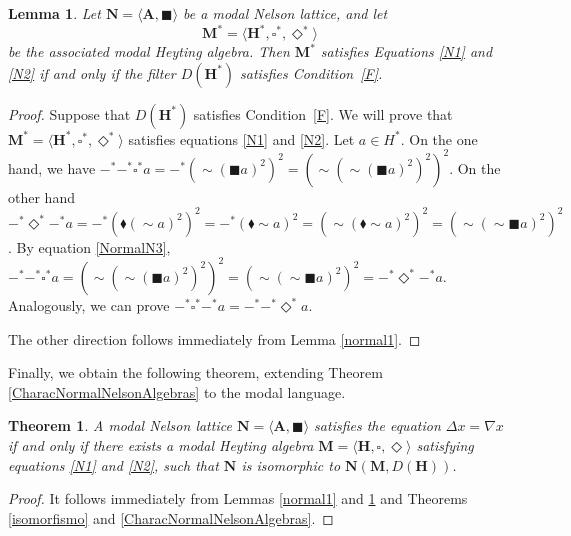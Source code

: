 \documentclass[pdflatex,sn-mathphys-num]{sn-jnl}%
\newtheorem{lemma}{Lemma}
\newcommand{\A}{\mathbf{A}}
\newcommand{\He}{\mathbf{H}}
\theoremstyle{thmstyleone}%
\newtheorem{theorem}{Theorem}%
\theoremstyle{thmstyletwo}%
\theoremstyle{thmstylethree}%
\begin{document}
\begin{lemma}\label{normal2}
Let $\mathbf{N}=\langle \A,\blacksquare\rangle$ be a modal Nelson lattice, and let
\[
\mathbf{M}^*=\langle \mathbf{H}^*,\square^*,\Diamond^*\rangle
\]
be the associated modal Heyting algebra. Then $\mathbf{M}^*$ satisfies Equations \eqref{N1} and \eqref{N2} if and only if the filter $D(\He^*)$ satisfies Condition~\eqref{F}.
\end{lemma}

\begin{proof}
Suppose that $D(\He^*)$ satisfies Condition~\eqref{F}. We will prove that $\mathbf{M}^*=\langle \He^*,\square^*,\Diamond^*\rangle$ satisfies equations \eqref{N1} and \eqref{N2}. Let $a\in H^*$. On the one hand, we have $-^*-^* \square^* a=-^*(\sim (\blacksquare a)^2 )^2=(\sim (\sim (\blacksquare a)^2 )^2)^2$. On the other hand $-^*\Diamond^*-^* a=-^*(\blacklozenge (\sim a)^2)^2=-^*(\blacklozenge \sim a)^2=(\sim (\blacklozenge \sim a)^2)^2=(\sim (\sim \blacksquare a)^2)^2$. By equation \eqref{NormalN3}, $-^*-^* \square^* a=(\sim (\sim (\blacksquare a)^2 )^2)^2=(\sim (\sim \blacksquare a)^2)^2=-^*\Diamond^*-^* a$. Analogously, we can prove $-^* \square^*-^* a=-^*-^*\Diamond^* a$.

The other direction follows immediately from Lemma \ref{normal1}.
\end{proof}

Finally, we obtain the following theorem, extending Theorem \ref{CharacNormalNelsonAlgebras} to the modal language.

\begin{theorem}
A modal Nelson lattice $\mathbf{N}=\langle\A,\blacksquare\rangle$ satisfies the equation $\Delta x = \nabla x$ if and only if there exists a modal Heyting algebra $\mathbf{M}=\langle \He, \square,\Diamond\rangle$ satisfying equations \eqref{N1} and \eqref{N2}, such that $\mathbf{N}$ is isomorphic to $\mathbf{N}(\mathbf{M},D(\He))$.
\end{theorem}

\begin{proof}
It follows immediately from Lemmas \ref{normal1} and \ref{normal2} and Theorems \ref{isomorfismo} and \ref{CharacNormalNelsonAlgebras}.
\end{proof}
\end{document}
